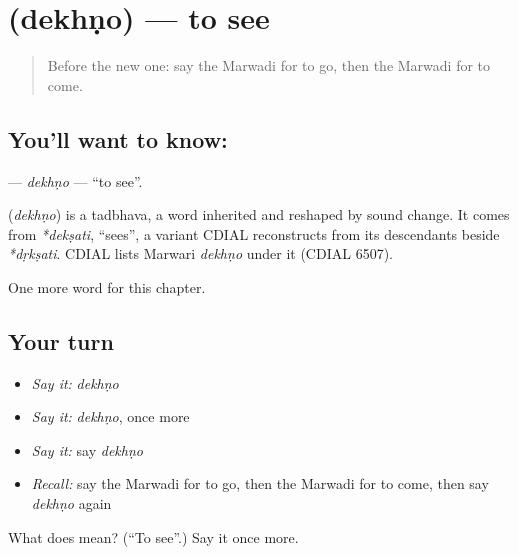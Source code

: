 \section[\texorpdfstring{\mw{देखणो} (dekhṇo)}{देखणो (dekhṇo)}]{ (dekhṇo) — to see}

\label{lesson:MW-C51-dekhno}



\begin{quote}
Before the new one: say the Marwadi for to go, then the Marwadi for to come.
\end{quote}

\subsection*{You'll want to know: }
\textbf{} — \emph{dekhṇo} — \textquotedblleft{}to see\textquotedblright{}.

\begin{cousinweb}
\textbf{} (\emph{dekhṇo}) is a tadbhava, a word inherited and reshaped by sound change. It comes from \emph{*dekṣati}, \textquotedblleft{}sees\textquotedblright{}, a variant CDIAL reconstructs from its descendants beside \emph{*dṛkṣati}. CDIAL lists Marwari \emph{dekhṇo} under it (CDIAL 6507).
\end{cousinweb}

\begin{grammarlens}[title={What you've built}]
One more word for this chapter.
\end{grammarlens}

\subsection*{Your turn}
\begin{itemize}
\raggedright
  \item \emph{Say it:} \emph{dekhṇo}
  \item \emph{Say it:} \emph{dekhṇo}, once more
  \item \emph{Say it:} say \emph{dekhṇo}
  \item \emph{Recall:} say the Marwadi for to go, then the Marwadi for to come, then say \emph{dekhṇo} again
\end{itemize}

\begin{tcolorbox}[breakable,colback=teal!4,colframe=teal!35!black,title={Before you move on}]
What does  mean? (\textquotedblleft{}To see\textquotedblright{}.) Say it once more.
\end{tcolorbox}
